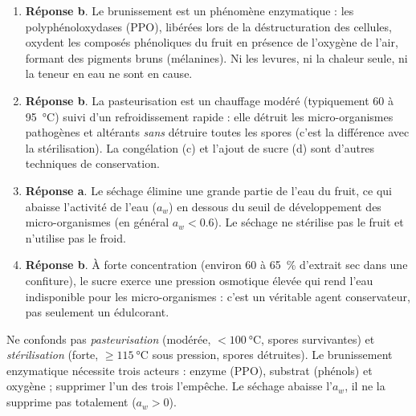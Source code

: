 \documentclass[11pt]{article}
\begin{document}
\begin{corrige}
\begin{enumerate}
\item \textbf{Réponse b}. Le brunissement est un phénomène enzymatique : les polyphénoloxydases (PPO), libérées lors de la déstructuration des cellules, oxydent les composés phénoliques du fruit en présence de l'oxygène de l'air, formant des pigments bruns (mélanines). Ni les levures, ni la chaleur seule, ni la teneur en eau ne sont en cause.
\item \textbf{Réponse b}. La pasteurisation est un chauffage modéré (typiquement $60$ à \SI{95}{\celsius}) suivi d'un refroidissement rapide : elle détruit les micro-organismes pathogènes et altérants \emph{sans} détruire toutes les spores (c'est la différence avec la stérilisation). La congélation (c) et l'ajout de sucre (d) sont d'autres techniques de conservation.
\item \textbf{Réponse a}. Le séchage élimine une grande partie de l'eau du fruit, ce qui abaisse l'activité de l'eau ($a_w$) en dessous du seuil de développement des micro-organismes (en général $a_w < \num{0,6}$). Le séchage ne stérilise pas le fruit et n'utilise pas le froid.
\item \textbf{Réponse b}. À forte concentration (environ $60$ à \SI{65}{\percent} d'extrait sec dans une confiture), le sucre exerce une pression osmotique élevée qui rend l'eau indisponible pour les micro-organismes : c'est un véritable agent conservateur, pas seulement un édulcorant.
\end{enumerate}
\end{corrige}

\begin{attention}
Ne confonds pas \emph{pasteurisation} (modérée, $< \SI{100}{\celsius}$, spores survivantes) et \emph{stérilisation} (forte, $\geq \SI{115}{\celsius}$ sous pression, spores détruites). Le brunissement enzymatique nécessite trois acteurs : enzyme (PPO), substrat (phénols) et oxygène ; supprimer l'un des trois l'empêche. Le séchage abaisse l'$a_w$, il ne la supprime pas totalement ($a_w > 0$).
\end{attention}
\end{document}
